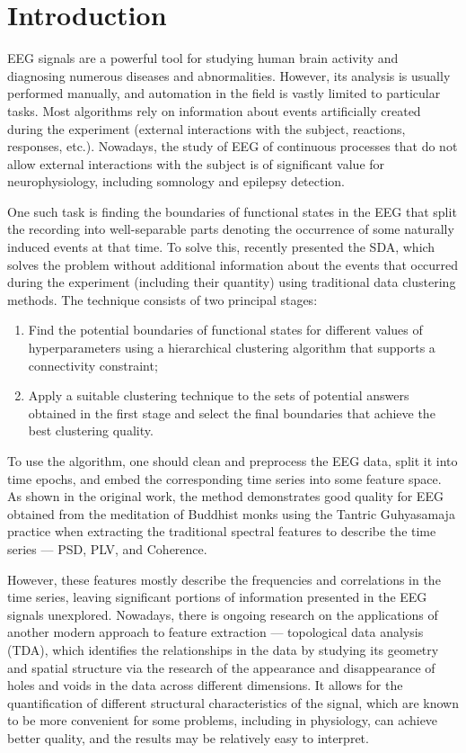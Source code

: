 \documentclass[10pt]{iopart}
\begin{document}
\submitto{\JNE}

\ioptwocol{}

\section{Introduction}

EEG signals are a powerful tool for studying human brain activity and diagnosing numerous diseases and abnormalities. However, its analysis is usually performed manually, and automation in the field is vastly limited to particular tasks. Most algorithms rely on information about events artificially created during the experiment (external interactions with the subject, reactions, responses, etc.). Nowadays, the study of EEG of continuous processes that do not allow external interactions with the subject is of significant value for neurophysiology, including somnology and epilepsy detection.

One such task is finding the boundaries of functional states in the EEG that split the recording into well-separable parts denoting the occurrence of some naturally induced events at that time. To solve this, \cite{SDA} recently presented the SDA, which solves the problem without additional information about the events that occurred during the experiment (including their quantity) using traditional data clustering methods. The technique consists of two principal stages:
\begin{enumerate}
    \item
        Find the potential boundaries of functional states for different values of hyperparameters using a hierarchical clustering algorithm that supports a connectivity constraint;
    \item
        Apply a suitable clustering technique to the sets of potential answers obtained in the first stage and select the final boundaries that achieve the best clustering quality.
\end{enumerate}


To use the algorithm, one should clean and preprocess the EEG data, split it into time epochs, and embed the corresponding time series into some feature space. As shown in the original work, the method demonstrates good quality for EEG obtained from the meditation of Buddhist monks using the Tantric Guhyasamaja practice when extracting the traditional spectral features to describe the time series --- PSD, PLV, and Coherence.

However, these features mostly describe the frequencies and correlations in the time series, leaving significant portions of information presented in the EEG signals unexplored. Nowadays, there is ongoing research on the applications of another modern approach to feature extraction --- topological data analysis (TDA), which identifies the relationships in the data by studying its geometry and spatial structure via the research of the appearance and disappearance of holes and voids in the data across different dimensions. It allows for the quantification of different structural characteristics of the signal, which are known to be more convenient for some problems, including in physiology, can achieve better quality, and the results may be relatively easy to interpret.
\end{document}
